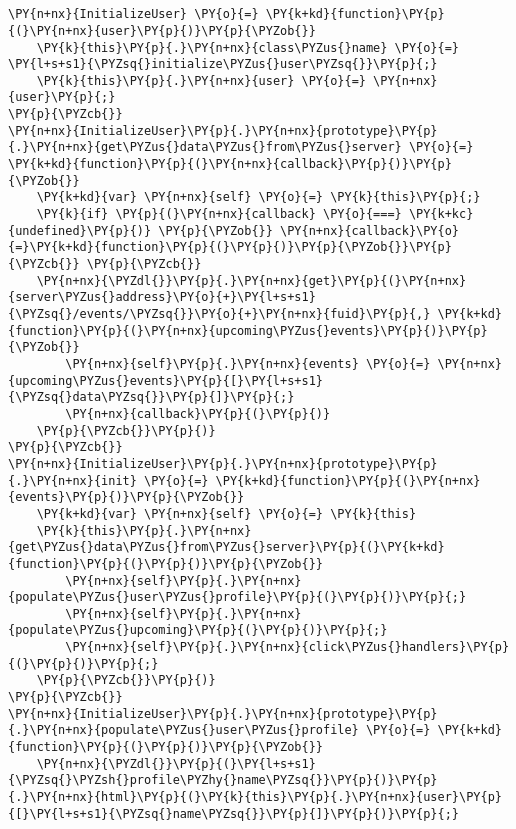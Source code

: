 \section*{}

\begin{Verbatim}[commandchars=\\\{\}]
\PY{n+nx}{InitializeUser} \PY{o}{=} \PY{k+kd}{function}\PY{p}{(}\PY{n+nx}{user}\PY{p}{)}\PY{p}{\PYZob{}}
    \PY{k}{this}\PY{p}{.}\PY{n+nx}{class\PYZus{}name} \PY{o}{=} \PY{l+s+s1}{\PYZsq{}initialize\PYZus{}user\PYZsq{}}\PY{p}{;}
    \PY{k}{this}\PY{p}{.}\PY{n+nx}{user} \PY{o}{=} \PY{n+nx}{user}\PY{p}{;}
\PY{p}{\PYZcb{}}
\PY{n+nx}{InitializeUser}\PY{p}{.}\PY{n+nx}{prototype}\PY{p}{.}\PY{n+nx}{get\PYZus{}data\PYZus{}from\PYZus{}server} \PY{o}{=} \PY{k+kd}{function}\PY{p}{(}\PY{n+nx}{callback}\PY{p}{)}\PY{p}{\PYZob{}}
    \PY{k+kd}{var} \PY{n+nx}{self} \PY{o}{=} \PY{k}{this}\PY{p}{;}
    \PY{k}{if} \PY{p}{(}\PY{n+nx}{callback} \PY{o}{===} \PY{k+kc}{undefined}\PY{p}{)} \PY{p}{\PYZob{}} \PY{n+nx}{callback}\PY{o}{=}\PY{k+kd}{function}\PY{p}{(}\PY{p}{)}\PY{p}{\PYZob{}}\PY{p}{\PYZcb{}} \PY{p}{\PYZcb{}}
    \PY{n+nx}{\PYZdl{}}\PY{p}{.}\PY{n+nx}{get}\PY{p}{(}\PY{n+nx}{server\PYZus{}address}\PY{o}{+}\PY{l+s+s1}{\PYZsq{}/events/\PYZsq{}}\PY{o}{+}\PY{n+nx}{fuid}\PY{p}{,} \PY{k+kd}{function}\PY{p}{(}\PY{n+nx}{upcoming\PYZus{}events}\PY{p}{)}\PY{p}{\PYZob{}}
        \PY{n+nx}{self}\PY{p}{.}\PY{n+nx}{events} \PY{o}{=} \PY{n+nx}{upcoming\PYZus{}events}\PY{p}{[}\PY{l+s+s1}{\PYZsq{}data\PYZsq{}}\PY{p}{]}\PY{p}{;}
        \PY{n+nx}{callback}\PY{p}{(}\PY{p}{)}
    \PY{p}{\PYZcb{}}\PY{p}{)}
\PY{p}{\PYZcb{}}
\PY{n+nx}{InitializeUser}\PY{p}{.}\PY{n+nx}{prototype}\PY{p}{.}\PY{n+nx}{init} \PY{o}{=} \PY{k+kd}{function}\PY{p}{(}\PY{n+nx}{events}\PY{p}{)}\PY{p}{\PYZob{}}
    \PY{k+kd}{var} \PY{n+nx}{self} \PY{o}{=} \PY{k}{this}
    \PY{k}{this}\PY{p}{.}\PY{n+nx}{get\PYZus{}data\PYZus{}from\PYZus{}server}\PY{p}{(}\PY{k+kd}{function}\PY{p}{(}\PY{p}{)}\PY{p}{\PYZob{}}
        \PY{n+nx}{self}\PY{p}{.}\PY{n+nx}{populate\PYZus{}user\PYZus{}profile}\PY{p}{(}\PY{p}{)}\PY{p}{;}
        \PY{n+nx}{self}\PY{p}{.}\PY{n+nx}{populate\PYZus{}upcoming}\PY{p}{(}\PY{p}{)}\PY{p}{;}
        \PY{n+nx}{self}\PY{p}{.}\PY{n+nx}{click\PYZus{}handlers}\PY{p}{(}\PY{p}{)}\PY{p}{;}
    \PY{p}{\PYZcb{}}\PY{p}{)}
\PY{p}{\PYZcb{}}
\PY{n+nx}{InitializeUser}\PY{p}{.}\PY{n+nx}{prototype}\PY{p}{.}\PY{n+nx}{populate\PYZus{}user\PYZus{}profile} \PY{o}{=} \PY{k+kd}{function}\PY{p}{(}\PY{p}{)}\PY{p}{\PYZob{}}
    \PY{n+nx}{\PYZdl{}}\PY{p}{(}\PY{l+s+s1}{\PYZsq{}\PYZsh{}profile\PYZhy{}name\PYZsq{}}\PY{p}{)}\PY{p}{.}\PY{n+nx}{html}\PY{p}{(}\PY{k}{this}\PY{p}{.}\PY{n+nx}{user}\PY{p}{[}\PY{l+s+s1}{\PYZsq{}name\PYZsq{}}\PY{p}{]}\PY{p}{)}\PY{p}{;}

\end{Verbatim}
